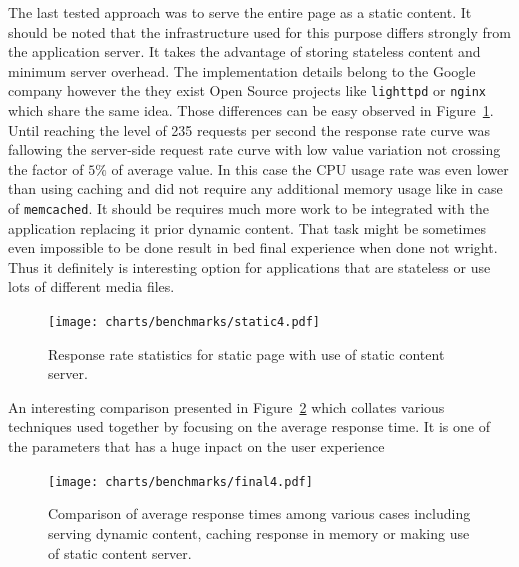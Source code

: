 The last tested approach was to serve the entire page as a static content. It should be noted that the infrastructure used for this purpose differs strongly from the application server. It takes the advantage of storing stateless content and minimum server overhead. The implementation details belong to the Google company however the they exist Open Source projects like \texttt{lighttpd} or \texttt{nginx} which share the same idea. Those differences can be easy observed in Figure~\ref{fig:sm_benchmark_static}. Until reaching the level of 235 requests per second the response rate curve was fallowing the server-side request rate curve with low value variation not crossing the factor of $5 \%$ of average value. In this case the CPU usage rate was even lower than using caching and did not require any additional memory usage like in case of \texttt{memcached}. It should be requires much more work to be integrated with the application replacing it prior dynamic content. That task might be sometimes even impossible to be done result in bed final experience when done not wright. Thus it definitely is interesting option for applications that are stateless or use lots of different media files.             
 \begin{figure}[ht]
  \begin{center}
	\texttt{[image: charts/benchmarks/static4.pdf]}
  \end{center}
  \caption{Response rate statistics for static page with use of static content server.}
\label{fig:sm_benchmark_static}
\end{figure}

An interesting comparison presented in Figure~\ref{fig:sm_resp_time_comapre} which collates various techniques used together by focusing on the average response time. It is one of the parameters that has a huge inpact on the user experience    
\begin{figure}[ht]
  \begin{center}
	\texttt{[image: charts/benchmarks/final4.pdf]}
  \end{center}
  \caption{Comparison of average response times among various cases including serving dynamic content, caching response in memory or making use of static content server.}
	\label{fig:sm_resp_time_comapre}
\end{figure}  